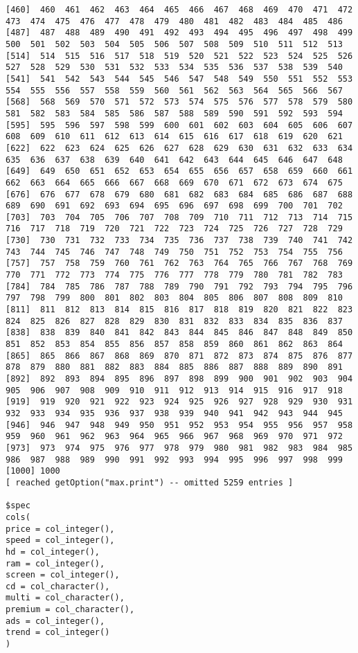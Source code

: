 \begin{lstlisting}
[460]  460  461  462  463  464  465  466  467  468  469  470  471  472  473  474  475  476  477  478  479  480  481  482  483  484  485  486
[487]  487  488  489  490  491  492  493  494  495  496  497  498  499  500  501  502  503  504  505  506  507  508  509  510  511  512  513
[514]  514  515  516  517  518  519  520  521  522  523  524  525  526  527  528  529  530  531  532  533  534  535  536  537  538  539  540
[541]  541  542  543  544  545  546  547  548  549  550  551  552  553  554  555  556  557  558  559  560  561  562  563  564  565  566  567
[568]  568  569  570  571  572  573  574  575  576  577  578  579  580  581  582  583  584  585  586  587  588  589  590  591  592  593  594
[595]  595  596  597  598  599  600  601  602  603  604  605  606  607  608  609  610  611  612  613  614  615  616  617  618  619  620  621
[622]  622  623  624  625  626  627  628  629  630  631  632  633  634  635  636  637  638  639  640  641  642  643  644  645  646  647  648
[649]  649  650  651  652  653  654  655  656  657  658  659  660  661  662  663  664  665  666  667  668  669  670  671  672  673  674  675
[676]  676  677  678  679  680  681  682  683  684  685  686  687  688  689  690  691  692  693  694  695  696  697  698  699  700  701  702
[703]  703  704  705  706  707  708  709  710  711  712  713  714  715  716  717  718  719  720  721  722  723  724  725  726  727  728  729
[730]  730  731  732  733  734  735  736  737  738  739  740  741  742  743  744  745  746  747  748  749  750  751  752  753  754  755  756
[757]  757  758  759  760  761  762  763  764  765  766  767  768  769  770  771  772  773  774  775  776  777  778  779  780  781  782  783
[784]  784  785  786  787  788  789  790  791  792  793  794  795  796  797  798  799  800  801  802  803  804  805  806  807  808  809  810
[811]  811  812  813  814  815  816  817  818  819  820  821  822  823  824  825  826  827  828  829  830  831  832  833  834  835  836  837
[838]  838  839  840  841  842  843  844  845  846  847  848  849  850  851  852  853  854  855  856  857  858  859  860  861  862  863  864
[865]  865  866  867  868  869  870  871  872  873  874  875  876  877  878  879  880  881  882  883  884  885  886  887  888  889  890  891
[892]  892  893  894  895  896  897  898  899  900  901  902  903  904  905  906  907  908  909  910  911  912  913  914  915  916  917  918
[919]  919  920  921  922  923  924  925  926  927  928  929  930  931  932  933  934  935  936  937  938  939  940  941  942  943  944  945
[946]  946  947  948  949  950  951  952  953  954  955  956  957  958  959  960  961  962  963  964  965  966  967  968  969  970  971  972
[973]  973  974  975  976  977  978  979  980  981  982  983  984  985  986  987  988  989  990  991  992  993  994  995  996  997  998  999
[1000] 1000
[ reached getOption("max.print") -- omitted 5259 entries ]

$spec
cols(
price = col_integer(),
speed = col_integer(),
hd = col_integer(),
ram = col_integer(),
screen = col_integer(),
cd = col_character(),
multi = col_character(),
premium = col_character(),
ads = col_integer(),
trend = col_integer()
)

\end{lstlisting}


